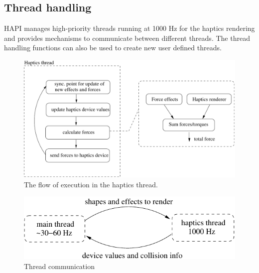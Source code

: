 \subsection{Thread handling}
HAPI manages high-priority threads running at 1000 Hz for the haptics
rendering and provides mechanisms to communicate between different
threads. The thread handling functions can also be used to create new
user defined threads.

\begin{figure} 
  \centering 
  \includegraphics{images/hapticsthread.pdf}
  \caption{The flow of execution in the haptics thread.}
  \label{haptics thread} 
\end{figure}

\begin{figure} 
  \centering 
  \includegraphics{images/threads.pdf}
  \caption{Thread communication}
  \label{threads} 
\end{figure}
